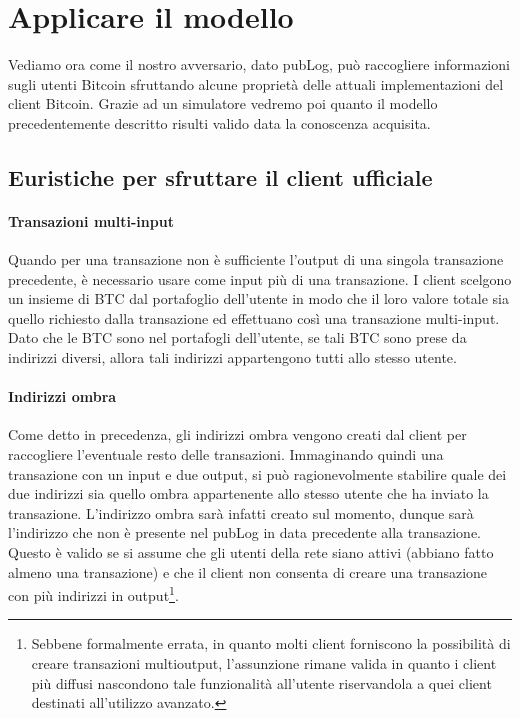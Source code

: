 \section{Applicare il modello}\label{valutazione-della-privacy-in-bitcoin}

Vediamo ora come il nostro avversario, dato pubLog, può raccogliere informazioni sugli utenti Bitcoin sfruttando alcune proprietà delle attuali implementazioni del client Bitcoin.
Grazie ad un simulatore vedremo poi quanto il modello precedentemente descritto risulti valido data la conoscenza acquisita.

\subsection{Euristiche per sfruttare il client ufficiale}

\paragraph{Transazioni multi-input}

Quando per una transazione non è sufficiente l'output di una singola transazione precedente, è necessario usare come input più di una transazione.
I client scelgono un insieme di BTC dal portafoglio dell'utente in modo che il loro valore totale sia quello richiesto dalla transazione ed effettuano così una transazione multi-input.
Dato che le BTC sono nel portafogli dell'utente, se tali BTC sono prese da indirizzi diversi, allora tali indirizzi appartengono tutti allo stesso utente.

\paragraph{Indirizzi ombra}

Come detto in precedenza, gli indirizzi ombra vengono creati dal client per raccogliere l'eventuale resto delle transazioni.
Immaginando quindi una transazione con un input e due output, si può ragionevolmente stabilire quale dei due indirizzi sia quello ombra appartenente allo stesso utente che ha inviato la transazione. L'indirizzo ombra sarà infatti creato sul momento, dunque sarà l'indirizzo che non è presente nel pubLog in data precedente alla transazione.
Questo è valido se si assume che gli utenti della rete siano attivi (abbiano fatto almeno una transazione) e che il client non consenta di creare una transazione con più indirizzi in output\footnote{Sebbene formalmente errata, in quanto molti client forniscono la possibilità di creare transazioni multioutput, l'assunzione rimane valida in quanto i client più diffusi nascondono tale funzionalità all'utente riservandola a quei client destinati all'utilizzo avanzato.}.

